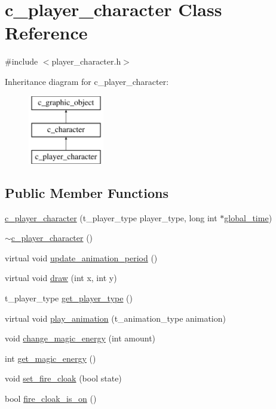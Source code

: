 \hypertarget{classc__player__character}{\section{c\-\_\-player\-\_\-character Class Reference}
\label{classc__player__character}
}


{\ttfamily \#include $<$player\-\_\-character.\-h$>$}

Inheritance diagram for c\-\_\-player\-\_\-character\-:\begin{figure}[H]
\begin{center}
\leavevmode
\includegraphics[height=3.000000cm]{classc__player__character}
\end{center}
\end{figure}
\subsection*{Public Member Functions}
\begin{DoxyCompactItemize}
\item 
\hyperlink{classc__player__character_a3779dab4cf22d1a5b9620ddae7fc11ef}{c\-\_\-player\-\_\-character} (t\-\_\-player\-\_\-type player\-\_\-type, long int $\ast$\hyperlink{classc__graphic__object_a9ff91aa7a60272a8f713ff011a0cc0bb}{global\-\_\-time})
\item 
\hyperlink{classc__player__character_a76c1d10523b82cc1683f435c10b4df60}{$\sim$c\-\_\-player\-\_\-character} ()
\item 
virtual void \hyperlink{classc__player__character_aa5d59edcb370d29b83ac0b2659ab0385}{update\-\_\-animation\-\_\-period} ()
\item 
virtual void \hyperlink{classc__player__character_a75d0ecbf8d1892422766f4f46ace576e}{draw} (int x, int y)
\item 
t\-\_\-player\-\_\-type \hyperlink{classc__player__character_ab284e034563a966f084a131de4472dbf}{get\-\_\-player\-\_\-type} ()
\item 
virtual void \hyperlink{classc__player__character_a6fd0d6503cd56998a4e2c8eb8695767b}{play\-\_\-animation} (t\-\_\-animation\-\_\-type animation)
\item 
void \hyperlink{classc__player__character_a84bc0fbb1f70bd2fa62edf89030cd070}{change\-\_\-magic\-\_\-energy} (int amount)
\item 
int \hyperlink{classc__player__character_a755e1fdb47029e1fc282a7cc2a5e0e88}{get\-\_\-magic\-\_\-energy} ()
\item 
void \hyperlink{classc__player__character_afe8f9b4f4a05e9c9c10df32988610cca}{set\-\_\-fire\-\_\-cloak} (bool state)
\item 
bool \hyperlink{classc__player__character_a10eeb77b1630c15fe16c36b244805430}{fire\-\_\-cloak\-\_\-is\-\_\-on} ()
\end{DoxyCompactItemize}
